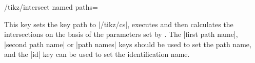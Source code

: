 \begin{key}{/tikz/intersect named paths=}
 
 This key sets the key path to |/tikz/cs|, executes  and
 then calculates the intersections on the basis of the parameters
 set by . The |first path name|, |second path name|
 or |path names| keys should be used to set the path name, and the
 |id| key can be used to set the identification name.
    
\begin{codeexample}[]
\end{codeexample}
   
\end{key}
